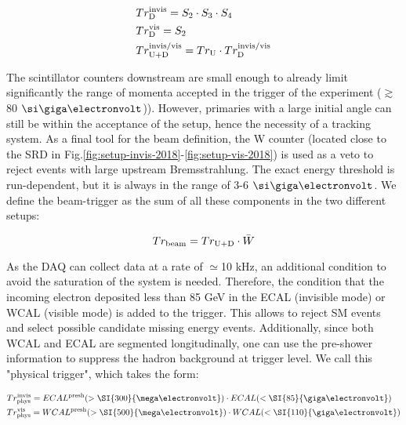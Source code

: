 \begin{equation}
\label{eq:trigger-downstream}
\begin{split}      
& Tr^{\rm{invis}}_{\rm{D}} = S_2 \cdot S_3 \cdot S_4 \\
& Tr^{\rm{vis}}_{\rm{D}} = S_2 \\
& Tr^{\rm{invis/vis}}_{\rm{U}+\rm{D}} = Tr_{\rm{U}} \cdot Tr^{\rm{invis/vis}}_{\rm{D}}
\end{split}
\end{equation}

The scintillator counters downstream are small enough to already limit significantly the range of momenta accepted in the trigger of the experiment ($\gtrsim$ 80 $\gev$)). However, primaries with a large initial angle can still be within the acceptance of the setup, hence the
necessity of a tracking system. As a final tool for the beam definition, the W counter (located close to the SRD in Fig.\ref{fig:setup-invis-2018}-\ref{fig:setup-vis-2018}) is used as a veto to reject events with large upstream Bremsstrahlung. The exact energy threshold is run-dependent, but it is always in the range of 3-6 $\gev$. We define the beam-trigger as the sum of all these components in the two different setups:

\begin{equation}
\label{eq:trigger-beam}
Tr_{\rm{beam}} = Tr_{\rm{U}+\rm{D}} \cdot \bar{W}
\end{equation}

As the DAQ can collect data at a rate of $\simeq$10 \si{kHz}, an additional condition to avoid the saturation of the system is needed. Therefore, the condition that the incoming electron deposited less than 85 GeV in the ECAL (invisible mode) or WCAL (visible mode) is added to the trigger. This allows to reject SM events and select possible candidate missing energy events. Additionally, since both WCAL and ECAL are segmented longitudinally, one can use the pre-shower information to suppress the hadron background at trigger level. We call this "physical trigger", which takes the form:

\begin{equation}
\label{eq:trigger-phys}
\begin{split}
& Tr^{\rm{invis}}_{\rm{phys}} = ECAL^{\rm{presh}}(> \SI{300}{\mega\electronvolt}) \cdot ECAL(<\SI{85}{\giga\electronvolt})\\
& Tr^{\rm{vis}}_{\rm{phys}} = WCAL^{\rm{presh}}(>\SI{500}{\mega\electronvolt}) \cdot WCAL(<\SI{110}{\giga\electronvolt})
\end{split}
\end{equation}

